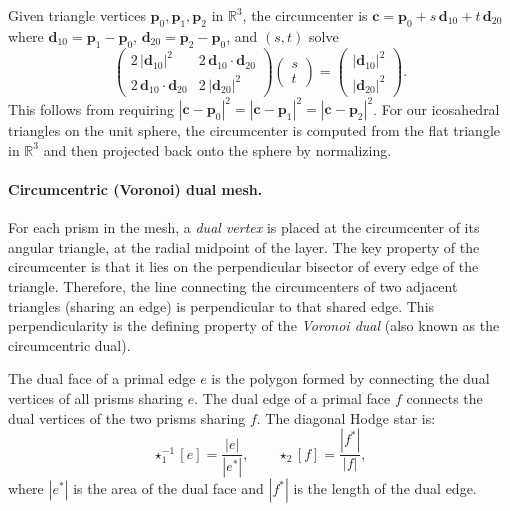 \documentclass[11pt,a4paper]{article}
\newcommand{\hodge}{\star}
\begin{document}
Given triangle vertices $\bm{p}_0, \bm{p}_1, \bm{p}_2$ in $\mathbb{R}^3$, the
circumcenter is $\bm{c} = \bm{p}_0 + s\,\bm{d}_{10} + t\,\bm{d}_{20}$ where
$\bm{d}_{10} = \bm{p}_1 - \bm{p}_0$, $\bm{d}_{20} = \bm{p}_2 - \bm{p}_0$,
and $(s, t)$ solve
\begin{equation}
  \begin{pmatrix}
    2\,|\bm{d}_{10}|^2 & 2\,\bm{d}_{10}\cdot\bm{d}_{20} \\
    2\,\bm{d}_{10}\cdot\bm{d}_{20} & 2\,|\bm{d}_{20}|^2
  \end{pmatrix}
  \begin{pmatrix} s \\ t \end{pmatrix}
  =
  \begin{pmatrix} |\bm{d}_{10}|^2 \\ |\bm{d}_{20}|^2 \end{pmatrix}.
  \label{eq:circumcenter}
\end{equation}
This follows from requiring $|\bm{c} - \bm{p}_0|^2 = |\bm{c} - \bm{p}_1|^2 =
|\bm{c} - \bm{p}_2|^2$. For our icosahedral triangles on the unit sphere, the
circumcenter is computed from the flat triangle in $\mathbb{R}^3$ and then
projected back onto the sphere by normalizing.

\paragraph{Circumcentric (Voronoi) dual mesh.}
For each prism in the mesh, a \emph{dual vertex} is placed at the circumcenter
of its angular triangle, at the radial midpoint of the layer. The key property
of the circumcenter is that it lies on the perpendicular bisector of every edge
of the triangle. Therefore, the line connecting the circumcenters of two
adjacent triangles (sharing an edge) is perpendicular to that shared edge. This
perpendicularity is the defining property of the \emph{Voronoi dual} (also
known as the circumcentric dual).

The dual face of a primal edge $e$ is the polygon formed by connecting the dual
vertices of all prisms sharing $e$. The dual edge of a primal face $f$ connects
the dual vertices of the two prisms sharing $f$. The diagonal Hodge star is:
\begin{equation}
  \hodge_1^{-1}[e] = \frac{|e|}{|e^*|}, \qquad
  \hodge_2[f] = \frac{|f^*|}{|f|},
  \label{eq:circumcentric_hodge}
\end{equation}
where $|e^*|$ is the area of the dual face and $|f^*|$ is the length of the
dual edge.
\end{document}
